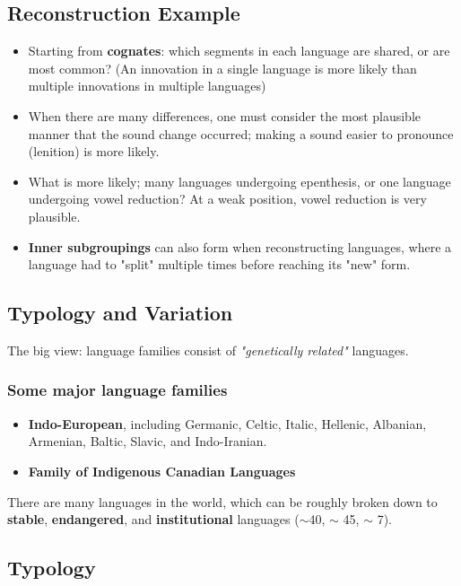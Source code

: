\documentclass[12pt]{article}
\begin{document}
\subsection{Reconstruction Example}

\begin{itemize}
  \item Starting from \textbf{cognates}: which segments in each language are shared, or are most common? (An innovation in a single language is more likely than multiple innovations in multiple languages)
  \item When there are many differences, one must consider the most plausible manner that the sound change occurred; making a sound easier to pronounce (lenition) is more likely.
  \item What is more likely; many languages undergoing epenthesis, or one language undergoing vowel reduction? At a weak position, vowel reduction is very plausible.
  \item \textbf{Inner subgroupings} can also form when reconstructing languages, where a language had to "split" multiple times before reaching its "new" form.
\end{itemize}

\subsection{Typology and Variation}

The big view: language families consist of \textit{"genetically related"} languages.

\subsubsection{Some major language families}

\begin{itemize}
  \item \textbf{Indo-European}, including Germanic, Celtic, Italic, Hellenic, Albanian, Armenian, Baltic, Slavic, and Indo-Iranian.
  \item \textbf{Family of Indigenous Canadian Languages}
\end{itemize}

There are many languages in the world, which can be roughly broken down to \textbf{stable}, \textbf{endangered}, and \textbf{institutional} languages ($\sim$40, $\sim$ 45, $\sim$ 7).

\subsection{Typology}
\end{document}
